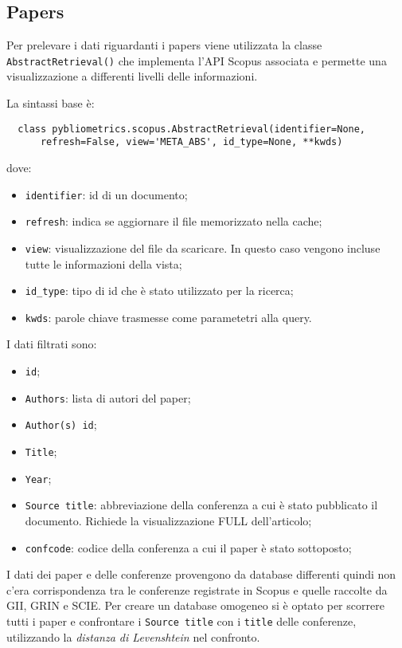 \subsection{Papers}
Per prelevare i dati riguardanti i papers viene utilizzata la classe \texttt{AbstractRetrieval()} che implementa l'API Scopus associata e permette una visualizzazione 
a differenti livelli delle informazioni.

La sintassi base è:
\begin{lstlisting}
  class pybliometrics.scopus.AbstractRetrieval(identifier=None, 
      refresh=False, view='META_ABS', id_type=None, **kwds)
\end{lstlisting}

dove:
\begin{itemize}
  \item \texttt{identifier}: id di un documento;
  \item \texttt{refresh}: indica se aggiornare il file memorizzato nella cache;
  \item \texttt{view}: visualizzazione del file da scaricare. In questo caso vengono incluse tutte le informazioni della vista;
  \item \texttt{id\_type}: tipo di id che è stato utilizzato per la ricerca;
  \item \texttt{kwds}: parole chiave trasmesse come parametetri alla query.
\end{itemize}

I dati filtrati sono:
\begin{itemize}
  \item \texttt{id};
  \item \texttt{Authors}: lista di autori del paper;
  \item \texttt{Author(s) id};
  \item \texttt{Title};
  \item \texttt{Year};
  \item \texttt{Source title}: abbreviazione della conferenza a cui è stato pubblicato il documento. Richiede la visualizzazione FULL dell'articolo;
  \item \texttt{confcode}: codice della conferenza a cui il paper è stato sottoposto;
\end{itemize}

I dati dei paper e delle conferenze provengono da database differenti quindi non c'era corrispondenza tra le conferenze registrate in Scopus e quelle raccolte da GII, 
GRIN e SCIE. Per creare un database omogeneo si è optato per scorrere tutti i paper e confrontare i \texttt{Source title} con i \texttt{title} delle conferenze, 
utilizzando la \textit{distanza di Levenshtein} nel confronto. 

